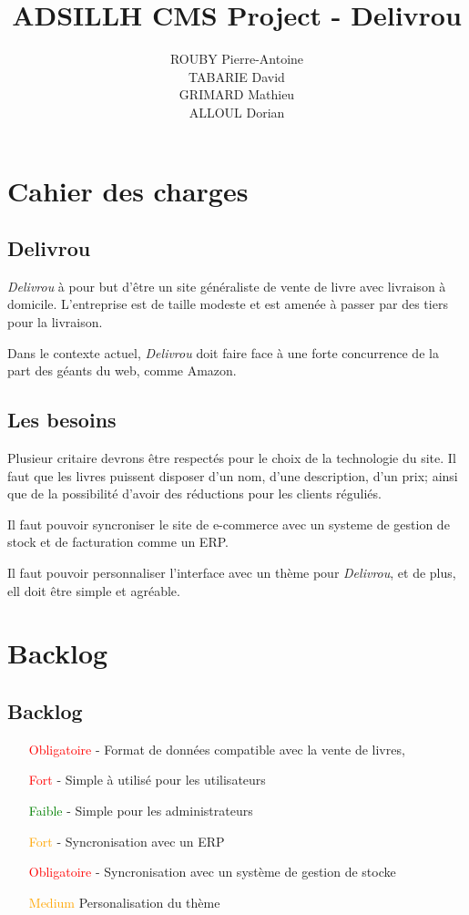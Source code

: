 \documentclass[a4paper,12pt]{report}
\title{ADSILLH CMS Project - Delivrou}
\author{ROUBY Pierre-Antoine \\ TABARIE David \\ GRIMARD Mathieu \\
  ALLOUL Dorian}
\begin{document}
\maketitle
\tableofcontents

\part{Cahier des charges}
\chapter{Delivrou}
\textit{Delivrou} à pour but d'être un site généraliste de vente de livre
avec livraison à domicile. L'entreprise est de taille modeste et est amenée
à passer par des tiers pour la livraison.

Dans le contexte actuel, \textit{Delivrou} doit faire face à une forte
concurrence de la part des géants du web, comme Amazon.

\chapter{Les besoins}
Plusieur critaire devrons être respectés pour le choix de la technologie du
site.
Il faut que les livres puissent disposer d'un nom, d'une description, d'un prix;
ainsi que de la possibilité d'avoir des réductions pour les clients réguliés.

Il faut pouvoir syncroniser le site de e-commerce avec un systeme de gestion
de stock et de facturation comme un ERP.

Il faut pouvoir personnaliser l'interface avec un thème pour
\textit{Delivrou}, et de plus, ell doit être simple et agréable.

\part{Backlog}
\chapter{Backlog}
\begin{itemize}
\item[\textcolor{red}{Obligatoire} -] Format de données compatible avec la vente
  de livres,
\item[\textcolor{red}{Fort} -] Simple à utilisé pour les utilisateurs
\item[\textcolor{green}{Faible} -] Simple pour les administrateurs
\item[\textcolor{orange}{Fort} -] Syncronisation avec un ERP
\item[\textcolor{red}{Obligatoire} -] Syncronisation avec un système de
  gestion de stocke
\item[\textcolor{orange}{Medium}] Personalisation du thème
\end{itemize}
\end{document}
